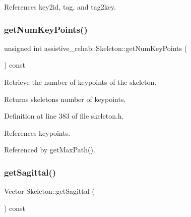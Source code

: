 References key2id, tag, and tag2key.

\mbox{\label{classassistive__rehab_1_1Skeleton_ac5e5b98f2c9178f6e0def5033e27922f}} 
\subsubsection{\texorpdfstring{getNumKeyPoints()}{getNumKeyPoints()}}
{\footnotesize\ttfamily unsigned int assistive\+\_\+rehab\+::\+Skeleton\+::get\+Num\+Key\+Points (\begin{DoxyParamCaption}{ }\end{DoxyParamCaption}) const\hspace{0.3cm}{\ttfamily [inline]}}



Retrieve the number of keypoints of the skeleton. 

\begin{DoxyReturn}{Returns}
skeleton\textquotesingle{}s number of keypoints. 
\end{DoxyReturn}


Definition at line 383 of file skeleton.\+h.


\begin{DoxyCode}{0}

\end{DoxyCode}


References keypoints.



Referenced by get\+Max\+Path().

\mbox{\label{classassistive__rehab_1_1Skeleton_a83133fabc903ddd4e54edf59df977167}} 
\subsubsection{\texorpdfstring{getSagittal()}{getSagittal()}}
{\footnotesize\ttfamily Vector Skeleton\+::get\+Sagittal (\begin{DoxyParamCaption}{ }\end{DoxyParamCaption}) const}



